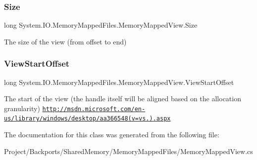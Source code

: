 \subsubsection{\texorpdfstring{Size}{Size}}
{\footnotesize\ttfamily long System.\+I\+O.\+Memory\+Mapped\+Files.\+Memory\+Mapped\+View.\+Size\hspace{0.3cm}{\ttfamily [get]}}



The size of the view (from offset to end) 

\mbox{\label{class_system_1_1_i_o_1_1_memory_mapped_files_1_1_memory_mapped_view_ad0648c88a67e3de3f48b6f5f022950f5}} 
\subsubsection{\texorpdfstring{View\+Start\+Offset}{ViewStartOffset}}
{\footnotesize\ttfamily long System.\+I\+O.\+Memory\+Mapped\+Files.\+Memory\+Mapped\+View.\+View\+Start\+Offset\hspace{0.3cm}{\ttfamily [get]}}



The start of the view (the handle itself will be aligned based on the allocation granularity) \href{http://msdn.microsoft.com/en-us/library/windows/desktop/aa366548(v=vs.85).aspx}{\tt http\+://msdn.\+microsoft.\+com/en-\/us/library/windows/desktop/aa366548(v=vs.).\+aspx} 



The documentation for this class was generated from the following file\+:\begin{DoxyCompactItemize}
\item 
Project/\+Backports/\+Shared\+Memory/\+Memory\+Mapped\+Files/Memory\+Mapped\+View.\+cs\end{DoxyCompactItemize}
